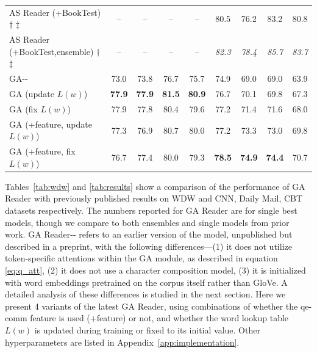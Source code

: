 \documentclass[11pt,a4paper]{article}
\newcommand{\blue}[1]{\textcolor{blue}{#1}}
\begin{document}
\begin{table}[ht]
\begin{tabular}{@{}l|cc|cc|cc|cc@{}}
AS Reader (+BookTest) $\dagger$ $\ddagger$ &	--	&	--	&	--	&	--	&	80.5	&	76.2	&	83.2	&	80.8	\\
AS Reader (+BookTest,ensemble) $\dagger$ $\ddagger$ &	--	&	--	&	--	&	--	&	\textit{82.3}	&	\textit{78.4}	&	\textit{85.7}	&	\textit{83.7}	\\ \midrule
GA-{}-   & 73.0   & 73.8    & 76.7     & 75.7    & 74.9     & 69.0  & 69.0      & 63.9         \\
GA (update $L(w)$)	&	\textbf{77.9}	&	\textbf{77.9}	&	\textbf{81.5}	&	\textbf{80.9}	&	76.7	&	70.1	&	69.8	&	67.3	\\
GA (fix $L(w)$)	&	77.9	&	77.8	&	80.4	&	79.6	&	77.2	&	71.4	&	71.6	&	68.0	\\
GA (+feature, update $L(w)$)	&	77.3	&	76.9	&	80.7	&	80.0	&	77.2	&	73.3	&	73.0	&	69.8	\\ 
GA (+feature, fix $L(w)$)	&	76.7	&	77.4	&	80.0	&	79.3	&	\textbf{78.5}	&	\textbf{74.9}	&	\textbf{74.4}	&	70.7	\\ \bottomrule
\end{tabular}
\end{table}


Tables~\ref{tab:wdw} and \ref{tab:results} show a comparison of the performance of GA Reader with previously published results on WDW and CNN, Daily Mail, CBT datasets respectively. The numbers reported for GA Reader are for single best models, though we compare to both ensembles and single models from prior work. GA Reader-{}- refers to an earlier version of the model, unpublished but described in a preprint,
with the following differences---(1) it does not utilize token-specific attentions within the GA module, as described in equation \eqref{eq:q_att}, (2) it does not use a character composition model, (3) it is initialized with word embeddings pretrained on the corpus itself rather than GloVe. A detailed analysis of these differences is studied in the next section. Here we present 4 variants of the latest GA Reader, using combinations of whether the qe-comm feature is used (+feature) or not, and whether the word lookup table $L(w)$ is updated during training or fixed to its initial value. Other hyperparameters are listed in Appendix~\ref{app:implementation}.
\end{document}
